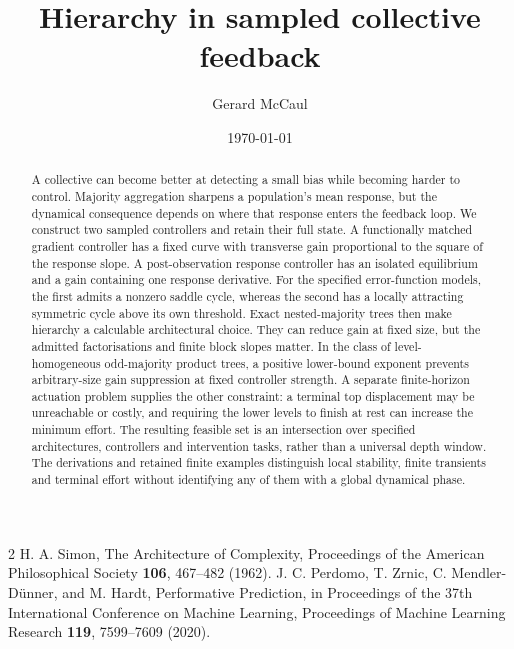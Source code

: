 \documentclass[aps,prx,reprint,superscriptaddress,floatfix]{revtex4-2}
\begin{document}
\title{Hierarchy in sampled collective feedback}
\author{Gerard McCaul}
\date{\today}
\begin{abstract}
A collective can become better at detecting a small bias while becoming harder to control. Majority aggregation sharpens a population's mean response, but the dynamical consequence depends on where that response enters the feedback loop. We construct two sampled controllers and retain their full state. A functionally matched gradient controller has a fixed curve with transverse gain proportional to the square of the response slope. A post-observation response controller has an isolated equilibrium and a gain containing one response derivative. For the specified error-function models, the first admits a nonzero saddle cycle, whereas the second has a locally attracting symmetric cycle above its own threshold. Exact nested-majority trees then make hierarchy a calculable architectural choice. They can reduce gain at fixed size, but the admitted factorisations and finite block slopes matter. In the class of level-homogeneous odd-majority product trees, a positive lower-bound exponent prevents arbitrary-size gain suppression at fixed controller strength. A separate finite-horizon actuation problem supplies the other constraint: a terminal top displacement may be unreachable or costly, and requiring the lower levels to finish at rest can increase the minimum effort. The resulting feasible set is an intersection over specified architectures, controllers and intervention tasks, rather than a universal depth window. The derivations and retained finite examples distinguish local stability, finite transients and terminal effort without identifying any of them with a global dynamical phase.
\end{abstract}
\maketitle







\appendix




\begin{thebibliography}{2}
H. A. Simon, The Architecture of Complexity,
Proceedings of the American Philosophical Society \textbf{106}, 467--482 (1962).
J. C. Perdomo, T. Zrnic, C. Mendler-D\"unner, and M. Hardt,
Performative Prediction, in Proceedings of the 37th International Conference
on Machine Learning, Proceedings of Machine Learning Research
\textbf{119}, 7599--7609 (2020).
\end{thebibliography}
\end{document}
